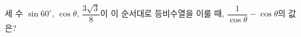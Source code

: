 세 수 $\sin 60^\circ$, $\cos\theta$, $\dfrac{3\sqrt{3}}{8}$이 이 순서대로 등비수열을 이룰 때, $\dfrac{1}{\cos\theta}-\cos\theta$의 값은? 
